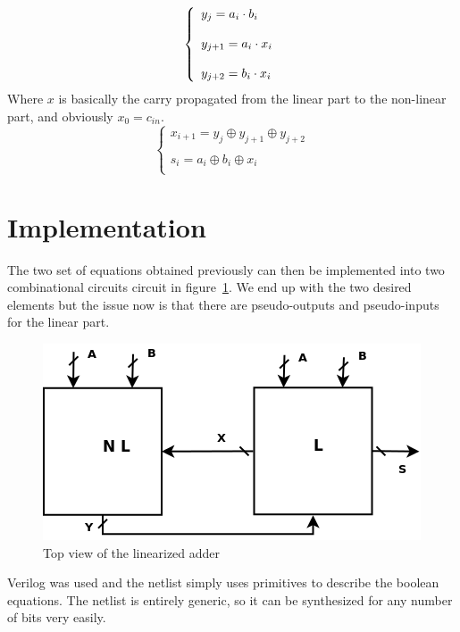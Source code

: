 \documentclass{article}
\begin{document}
\begin{equation}
        \left\{
\begin{array}{l  c  r }
        y_{j} = a_i \cdot b_i\\
        \\
        y_{j+1} = a_i \cdot x_i\\
        \\
        y_{j+2} = b_i \cdot x_i\\
\end{array}
\right.
\label{eq:nonlin}
\end{equation}
Where $x$ is basically the carry propagated from the linear part to the non-linear part, and obviously $x_0=c_{in}$.
\begin{equation}
\left\{
\begin{array}{l}
        x_{i+1} = y_{j} \oplus y_{j+1} \oplus y_{j+2} \\
        \\
        s_i = a_i \oplus b_i \oplus x_i\\
\end{array}
\right.
\label{eq:lin}
\end{equation}

\section{Implementation}

The two set of equations obtained previously can then be implemented into two combinational circuits circuit in figure~\ref{fig:top}.
We end up with the two desired elements but the issue now is that there are pseudo-outputs and pseudo-inputs for the linear part. %

\begin{figure}
        \centering
        \includegraphics[scale=0.5]{top_view.png}
        \caption{Top view of the linearized adder}
        \label{fig:top}
\end{figure}
Verilog was used and the netlist simply uses primitives to describe the boolean equations. The netlist is entirely generic, so it can be synthesized for any number of bits very easily. 
\end{document}
